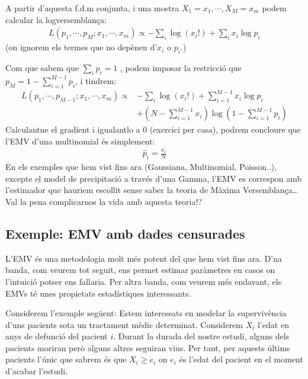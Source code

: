 \documentclass[letterpaper,10pt,english]{sphinxmanual}
\begin{document}
A partir d’aquesta f.d.m conjunta, i una mostra \(X_1=x_1, \cdots, X_M=x_m\)
podem calcular la log\sphinxhyphen{}versemblança:
\begin{equation*}
\begin{split}L( p_1, \cdots, p_M; x_1, \cdots, x_m) \propto - \sum_i \log (x_i!) + \sum_i x_i \log p_i\end{split}
\end{equation*}
(on ignorem els termes que no depènen d’\(x_i\) o \(p_i\).)

Com que sabem que \(\sum_i p_i = 1\) , podem imposar la restricció que \(p_M = 1 - \sum_{i=1}^{M-1} p_i\),
i tindrem:
\begin{equation*}
\begin{split}L( p_1, \cdots, p_{M-1}; x_1, \cdots, x_m) \propto&  - \sum_i \log (x_i!) + \sum_{i=1}^{M-1} x_i \log p_i \\
    & + (N - \sum_{i=1}^{M-1} x_i ) \log (1 - \sum_{i=1}^{M-1} p_i)\end{split}
\end{equation*}
Calculant\sphinxhyphen{}ne el gradient i igualant\sphinxhyphen{}lo a 0 (exercici per casa), podrem concloure que l’EMV d’una multinomial és simplement:
\begin{equation*}
\begin{split}\hat{p}_i = \frac{x_i}{N}\end{split}
\end{equation*}
En els exemples que hem vist fins ara (Gaussiana, Multinomial, Poisson..), excepte el model de precipitació a través d’una Gamma,
l’EMV es correspon amb l’estimador que hauriem escollit sense saber la teoria de Màxima Versemblança…
Val la pena complicar\sphinxhyphen{}nos la vida amb aquesta teoria!?


\subsection{Exemple: EMV amb dades censurades}
\label{\detokenize{0_Intro/0_3_Estimacio:exemple-emv-amb-dades-censurades}}
L’EMV és una metodologia molt més potent del que hem vist fins ara. D’na banda, com veurem tot seguit,
ens permet estimar paràmetres en casos on l’intuició potser ens fallaria. Per altra banda, com veurem
més endavant, els EMVs té unes propietats estadístiques interessants.

Considerem l’exemple següent: Estem interessats en modelar
la supervivència d’uns pacients sota un tractament mèdic determinat.
Considerem \(X_i\) l’edat en anys de defunció del pacient \(i\).
Durant la durada del nostre estudi, alguns dels pacients moriran
però alguns altres seguiran vius. Per tant, per aquests últims
pacients l’únic que sabrem és que \(X_i \geq e_i\) on
\(e_i\) és l’edat del pacient en el moment d’acabar l’estudi.
\end{document}
